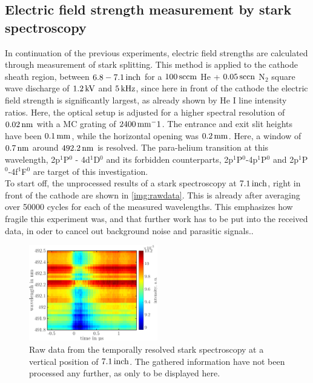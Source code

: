 \documentclass[a4paper,10pt,twoside]{article}
\begin{document}
	\subsection{Electric field strength measurement by stark spectroscopy}
		
		In continuation of the previous experiments, electric field strengths are calculated through measurement of stark splitting. This method is applied to the cathode sheath region, between $\unit[6.8-7.1]{inch}$ for a $\unit[100]{sccm}$ He + $\unit[0.05]{sccn}$ N$_2$ square wave discharge of $\unit[1.2]{kV}$ and $\unit[5]{kHz}$, since here in front of the cathode the electric field strength is significantly largest, as already shown by He I line intensity ratios. Here, the optical setup is adjusted for a higher spectral resolution of $\unit[0.02]{nm}$ with a MC grating of $\unit[2400]{mm^-1}$. The entrance and exit slit heights have been $\unit[0.1]{mm}$, while the horizontal opening was $\unit[0.2]{mm}$. Here, a window of $\unit[0.7]{nm}$ around $\unit[492.2]{nm}$ is resolved. The para-helium transition at this wavelength, 2p$^1$P$^0$ - 4d$^1$D$^0$ and its forbidden counterparts, 2p$^1$P$^0$-4p$^1$P$^0$ and 2p$^1$P$^0$-4f$^1$F$^0$ are target of this investigation.\\
		To start off, the unprocessed results of a stark spectroscopy at $\unit[7.1]{inch}$, right in front of the cathode are shown in \autoref{img:rawdata}. This is already after averaging over 50000 cycles for each of the measured wavelengths. This emphasizes how fragile this experiment was, and that further work has to be put into the received data, in oder to cancel out background noise and parasitic signals..
		
			\begin{figure}[b!]
				\centering
				\includegraphics[width=0.5\textwidth]{figures/stark/stark_71inraw.pdf}
				\caption{Raw data from the temporally resolved stark spectroscopy at a vertical position of $\unit[7.1]{inch}$. The gathered information have not been processed any further, as only to be displayed here.}
				\label{img:rawdata}
			\end{figure}
			
\end{document}
